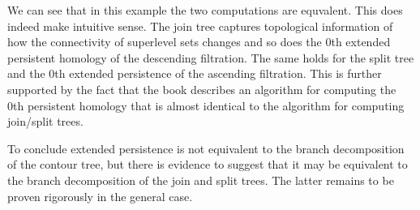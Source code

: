 We can see that in this example the two computations are equvalent. This does indeed make intuitive sense. The join tree captures topological information of how the connectivity of superlevel sets changes and so does the 0th extended persistent homology of the descending filtration. The same holds for the split tree and the 0th extended persistence of the ascending filtration. This is further supported by the fact that the book \cite{comp-topo} describes an algorithm for computing the 0th persistent homology that is almost identical to the algorithm for computing join/split trees.

To conclude extended persistence is not equivalent to the branch decomposition of the contour tree, but there is evidence to suggest that it may be equivalent to the branch decomposition of the join and split trees. The latter remains to be proven rigorously in the general case.




%
%
%





